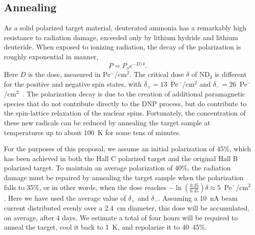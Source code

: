 \documentclass[preprint,12pt]{elsarticle}
\begin{document}
\subsection{Annealing}
As a solid polarized target material, deuterated ammonia has a remarkably high resistance to radiation damage, 
exceeded only by lithium hydride and lithium deuteride.
When exposed to ionizing radiation, the decay of the polarization is roughly exponential in manner,
\begin{equation}
	P = P_o e^{-D/\delta}.
\end{equation}
Here $D$ is the dose, measured in Pe$^{\minus}$/cm$^2$.
The critical dose $\delta$ of ND$_3$ is different for the positive and negative spin states, with
$\delta_{\plus} = 13$~Pe$^{\minus}$/cm$^2$ and $\delta_{\minus} = 26$~Pe$^{\minus}$/cm$^2$~\cite{Goertz2002}.  The polarization decay is due to the creation of additional paramagnetic species that do not contribute directly to the DNP process, but do contribute to the spin-lattice relaxation of the nuclear spins.
Fortunately, the concentration of these new radicals can be reduced by annealing the target sample at temperatures up to about 100~K for some tens of minutes.

For the purposes of this proposal, we assume an initial polarization of 45\%, which has been achieved 
in both the Hall C polarized target and the original Hall B polarized target.  To maintain an average polarization
of 40\%, the radiation damage must be repaired by annealing the target sample when the polarization falls to 35\%, or in other words, when the dose reaches 
$\minus \ln(\frac{0.35}{0.45})\delta \approx 5$~Pe$^{\minus}$/cm$^2$.  
Here we have used the average value of $\delta_{\plus}$ and $\delta_{\minus}$.  
Assuming a 10~nA beam current distributed evenly over a 2.4~cm diameter, 
this dose will be accumulated, on average, after 4 days.  We estimate a total of four hours will be required to anneal the target, cool it back to 1~K, and repolarize it to 40--45\%.
\end{document}
